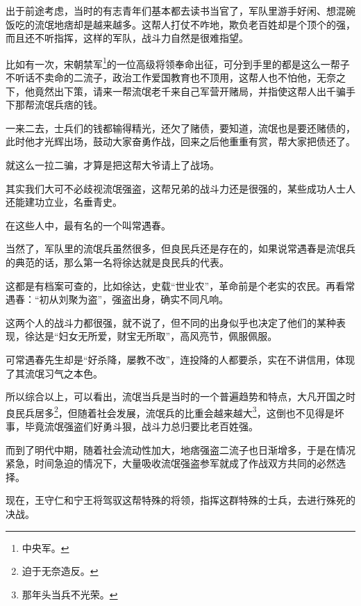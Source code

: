 \begin{multicols}{\theparacolNo}
出于前途考虑，当时的有志青年们基本都去读书当官了，军队里游手好闲、想混碗饭吃的流氓地痞却是越来越多。这帮人打仗不咋地，欺负老百姓却是个顶个的强，而且还不听指挥，这样的军队，战斗力自然是很难指望。

比如有一次，宋朝禁军\footnote{中央军。}的一位高级将领奉命出征，可分到手里的都是这么一帮子不听话不卖命的二流子，政治工作爱国教育也不顶用，这帮人也不怕他，无奈之下，他竟然出下策，请来一帮流氓老千来自己军营开赌局，并指使这帮人出千骗手下那帮流氓兵痞的钱。

一来二去，士兵们的钱都输得精光，还欠了赌债，要知道，流氓也是要还赌债的，此时他才光辉出场，鼓动大家奋勇作战，回来之后他重重有赏，帮大家把债还了。

就这么一拉二骗，才算是把这帮大爷请上了战场。

其实我们大可不必歧视流氓强盗，这帮兄弟的战斗力还是很强的，某些成功人士人还能建功立业，名垂青史。

在这些人中，最有名的一个叫常遇春。

当然了，军队里的流氓兵虽然很多，但良民兵还是存在的，如果说常遇春是流氓兵的典范的话，那么第一名将徐达就是良民兵的代表。

这都是有档案可查的，比如徐达，史载“世业农”，革命前是个老实的农民。再看常遇春：“初从刘聚为盗”，强盗出身，确实不同凡响。

这两个人的战斗力都很强，就不说了，但不同的出身似乎也决定了他们的某种表现，徐达是“妇女无所爱，财宝无所取”，高风亮节，佩服佩服。

可常遇春先生却是“好杀降，屡教不改”，连投降的人都要杀，实在不讲信用，体现了其流氓习气之本色。

所以综合以上，可以看出，流氓当兵是当时的一个普遍趋势和特点，大凡开国之时良民兵居多\footnote{迫于无奈造反。}，但随着社会发展，流氓兵的比重会越来越大\footnote{那年头当兵不光荣。}，这倒也不见得是坏事，毕竟流氓强盗们好勇斗狠，战斗力总归要比老百姓强。

而到了明代中期，随着社会流动性加大，地痞强盗二流子也日渐增多，于是在情况紧急，时间急迫的情况下，大量吸收流氓强盗参军就成了作战双方共同的必然选择。

现在，王守仁和宁王将驾驭这帮特殊的将领，指挥这群特殊的士兵，去进行殊死的决战。
\ifnum{}
	\end{multicols}
\fi
\newpage
